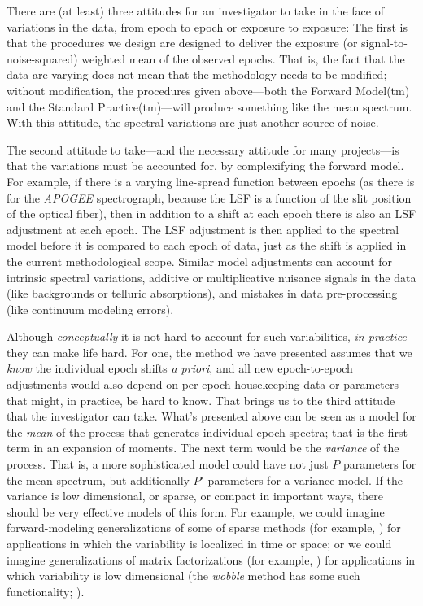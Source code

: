 \documentclass[modern]{aastex631}
\begin{document}
There are (at least) three attitudes for an investigator to take in the face of variations in the data, from epoch to epoch or exposure to exposure:
The first is that the procedures we design are designed to deliver the exposure (or signal-to-noise-squared) weighted mean of the observed epochs.
That is, the fact that the data are varying does not mean that the methodology needs to be modified; without modification, the procedures given above---both the Forward Model(tm) and the Standard Practice(tm)---will produce something like the mean spectrum.
With this attitude, the spectral variations are just another source of noise.

The second attitude to take---and the necessary attitude for many projects---is that the variations must be accounted for, by complexifying the forward model.
For example, if there is a varying line-spread function between epochs (as there is for the \textsl{APOGEE} spectrograph, because the LSF is a function of the slit position of the optical fiber), then in addition to a shift at each epoch there is also an LSF adjustment at each epoch.
The LSF adjustment is then applied to the spectral model before it is compared to each epoch of data, just as the shift is applied in the current methodological scope.
Similar model adjustments can account for intrinsic spectral variations, additive or multiplicative nuisance signals in the data (like backgrounds or telluric absorptions), and mistakes in data pre-processing (like continuum modeling errors).

Although \emph{conceptually} it is not hard to account for such variabilities, \emph{in practice} they can make life hard.
For one, the method we have presented assumes that we \emph{know} the individual epoch shifts \textsl{a priori}, and all new epoch-to-epoch adjustments would also depend on per-epoch housekeeping data or parameters that might, in practice, be hard to know.
That brings us to the third attitude that the investigator can take.
What's presented above can be seen as a model for the \emph{mean} of the process that generates individual-epoch spectra; that is the first term in an expansion of moments.
The next term would be the \emph{variance} of the process.
That is, a more sophisticated model could have not just $P$ parameters for the mean spectrum, but additionally $P'$ parameters for a variance model.
If the variance is low dimensional, or sparse, or compact in important ways, there should be very effective models of this form.
For example, we could imagine forward-modeling generalizations of some of sparse methods (for example, \citealt{candes}) for applications in which the variability is localized in time or space; or we could imagine generalizations of matrix factorizations (for example, \citealt{hmf}) for applications in which variability is low dimensional (the \textsl{wobble} method has some such functionality; \citealt{wobble}).
\end{document}
